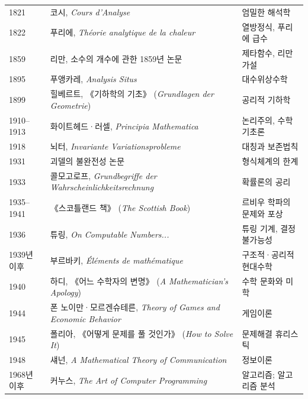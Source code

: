 \begin{center}
\begin{longtable}{@{}L{0.15\textwidth}L{0.31\textwidth}L{0.46\textwidth}@{}}
1821 & 코시, \textit{Cours d'Analyse} & 엄밀한 해석학\\
1822 & 푸리에, \textit{Théorie analytique de la chaleur} & 열방정식, 푸리에 급수\\
1859 & 리만, 소수의 개수에 관한 1859년 논문 & 제타함수, 리만 가설\\
1895 & 푸앵카레, \textit{Analysis Situs} & 대수위상수학\\
1899 & 힐베르트, 《기하학의 기초》 (\textit{Grundlagen der Geometrie}) & 공리적 기하학\\
1910--1913 & 화이트헤드·러셀, \textit{Principia Mathematica} & 논리주의, 수학기초론\\
1918 & 뇌터, \textit{Invariante Variationsprobleme} & 대칭과 보존법칙\\
1931 & 괴델의 불완전성 논문 & 형식체계의 한계\\
1933 & 콜모고로프, \textit{Grundbegriffe der Wahrscheinlichkeitsrechnung} & 확률론의 공리\\
1935--1941 & 《스코틀랜드 책》 (\textit{The Scottish Book}) & 르비우 학파의 문제와 포상\\
1936 & 튜링, \textit{On Computable Numbers...} & 튜링 기계, 결정불가능성\\
1939년 이후 & 부르바키, \textit{Éléments de mathématique} & 구조적·공리적 현대수학\\
1940 & 하디, 《어느 수학자의 변명》 (\textit{A Mathematician's Apology}) & 수학 문화와 미학\\
1944 & 폰 노이만·모르겐슈테른, \textit{Theory of Games and Economic Behavior} & 게임이론\\
1945 & 폴리아, 《어떻게 문제를 풀 것인가》 (\textit{How to Solve It}) & 문제해결 휴리스틱\\
1948 & 섀넌, \textit{A Mathematical Theory of Communication} & 정보이론\\
1968년 이후 & 커누스, \textit{The Art of Computer Programming} & 알고리즘; 알고리즘 분석\\
\end{longtable}
\end{center}


